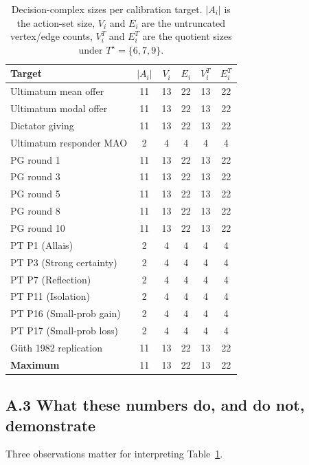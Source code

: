 \documentclass[11pt]{article}
\theoremstyle{definition}
\theoremstyle{remark}
\begin{document}
\begin{table}[h]
\centering
\renewcommand{\arraystretch}{1.1}
\caption{Decision-complex sizes per calibration target.
$|A_i|$ is the action-set size, $V_i$ and $E_i$ are the untruncated vertex/edge counts,
$V_i^T$ and $E_i^T$ are the quotient sizes under $T^\star = \{6, 7, 9\}$.}
\label{tab:per-target-vt}
\begin{tabular}{l c c c c c}
\toprule
\textbf{Target} & $|A_i|$ & $V_i$ & $E_i$ & $V_i^T$ & $E_i^T$ \\
\midrule
Ultimatum mean offer       & 11 & 13 & 22 & 13 & 22 \\
Ultimatum modal offer      & 11 & 13 & 22 & 13 & 22 \\
Dictator giving            & 11 & 13 & 22 & 13 & 22 \\
Ultimatum responder MAO    &  2 &  4 &  4 &  4 &  4 \\
PG round 1                 & 11 & 13 & 22 & 13 & 22 \\
PG round 3                 & 11 & 13 & 22 & 13 & 22 \\
PG round 5                 & 11 & 13 & 22 & 13 & 22 \\
PG round 8                 & 11 & 13 & 22 & 13 & 22 \\
PG round 10                & 11 & 13 & 22 & 13 & 22 \\
PT P1 (Allais)             &  2 &  4 &  4 &  4 &  4 \\
PT P3 (Strong certainty)   &  2 &  4 &  4 &  4 &  4 \\
PT P7 (Reflection)         &  2 &  4 &  4 &  4 &  4 \\
PT P11 (Isolation)         &  2 &  4 &  4 &  4 &  4 \\
PT P16 (Small-prob gain)   &  2 &  4 &  4 &  4 &  4 \\
PT P17 (Small-prob loss)   &  2 &  4 &  4 &  4 &  4 \\
G\"uth 1982 replication    & 11 & 13 & 22 & 13 & 22 \\
\midrule
\textbf{Maximum}           & 11 & 13 & 22 & 13 & 22 \\
\bottomrule
\end{tabular}
\end{table}

\subsection*{A.3 What these numbers do, and do not, demonstrate}

Three observations matter for interpreting Table~\ref{tab:per-target-vt}.
\end{document}
